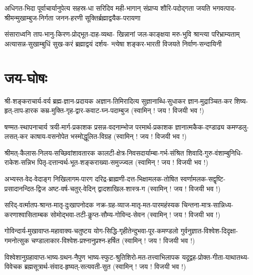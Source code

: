 
\fourlineindentedshloka
{अधिगत-भिदा पूर्वाचार्यानुपेत्य सहस्र-धा}
{सरिदिव मही-भागान् संप्राप्य शौरि-पदोद्गता}
{जयति भगवत्पाद-श्रीमन्मुखाम्बुज-निर्गता}
{जनन-हरणी सूक्तिर्ब्रह्माद्वयैक-परायणा}


\fourlineindentedshloka
{संसाराध्वनि ताप-भानु-किरण-प्रोद्भूत-दाह-व्यथा-}
{खिन्नानां जल-काङ्क्षया मरु-भुवि श्रान्त्या परिभ्राम्यताम्}
{अत्यासन्न-सुखाम्बुधिं सुख-करं ब्रह्माद्वयं दर्शय-}
{न्त्येषा शङ्कर-भारती विजयते निर्वाण-सन्दायिनी}



\newcommand{\jayavijayibhava}{\hfill (स्वामिन् ! जय ! विजयी भव !)}

\section{जय-घोषः}

\twolineshloka
{श्री-शङ्कराचार्य-वर्य ब्रह्म-ज्ञान-प्रदायक}
{अज्ञान-तिमिरादित्य सुज्ञानाब्धि-सुधाकर}
\twolineshloka
{ज्ञान-मुद्राञ्चित-कर शिष्य-हृत्-ताप-हारक}
{कम्र-मुक्ति-गृह-द्वार-कवाट-घ्न-पदाम्बुज}
\jayavijayibhava

\twolineshloka
{षण्मत-स्थापनाचार्य त्रयी-मार्ग-प्रकाशक}
{प्रसन्न-वदनाम्भोज परमार्थ-प्रकाशक}
\twolineshloka
{ज्ञानात्मकैक-दण्डाढ्य कमण्डलु-लसत्-कर}
{काषाय-वसनोपेत भस्मोद्धूलित-विग्रह}
\jayavijayibhava

\twolineshloka
{श्रीमत्-कैलास-निलय-सच्छिवांशावतारक}
{कालटी-क्षेत्र-निवसदार्याम्बा-गर्भ-संश्रित}
\twolineshloka
{शिवादि-गुरु-वंशाम्बुनिधि-राकेश-सन्निभ}
{पितृ-दत्तान्वर्थ-भूत-शङ्कराख्या-समुज्ज्वल}
\jayavijayibhava

\twolineshloka
{अभ्यस्त-वेद-वेदाङ्ग निखिलागम-पारग}
{दरिद्र-ब्राह्मणी-दत्त-भिक्षामलक-तोषित}
\twolineshloka
{स्वर्णामलक-सद्वृष्टि-प्रसादानन्दित-द्विज}
{अष्ट-वर्ष-चतुर्-वेदिन् द्वादशाखिल-शास्त्र-ग}
\jayavijayibhava

\twolineshloka
{सरिद्-वर्त्मातप-श्रान्त-मातृ-दुःखापनोदक}
{नक्र-ग्रह-व्याज-मातृ-मत-पारमहंस्यक}
\twolineshloka
{चिन्तना-मात्र-सान्निध्य-करणाश्वासिताम्बक}
{सोमोद्भवा-तटी-कॢप्त-सौम्य-गोविन्द-सेवन}
\jayavijayibhava

\twolineshloka
{गोविन्दार्य-मुखावाप्त-महावाक्य-चतुष्टय}
{योग-सिद्धि-गृहीतेन्दुभवा-पूर-कमण्डलो}
\twolineshloka
{गुर्वनुज्ञात-विश्वेश-दिदृक्षा-गमनोत्सुक}
{चण्डालाकार-विश्वेश-प्रश्नानुप्रश्न-हर्षित}
\jayavijayibhava

\twolineshloka
{विश्वेशानुग्रहावाप्त-भाष्य-ग्रथन-नैपुण}
{भाष्य-स्फुट-श्रुतिशिरो-मत-तत्त्वाभिलापक}
\twolineshloka
{यदूद्वह-प्रोक्त-गीता-याथातथ्य-विवेचक}
{ब्रह्मसूत्रार्थ-संवाद-हृष्यत्-सत्यवती-सुत}
\jayavijayibhava

